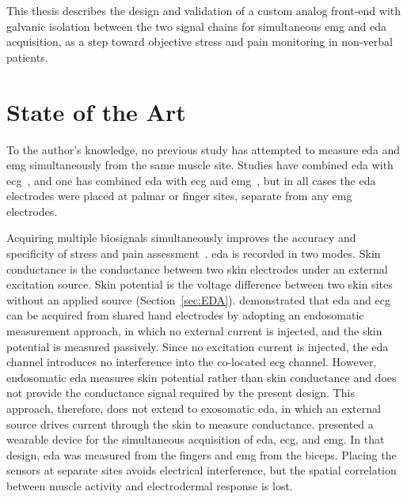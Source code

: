 This thesis describes the design and validation of a custom analog front-end with galvanic isolation between the two signal chains for simultaneous \gls{emg} and \gls{eda} acquisition, as a step toward objective stress and pain monitoring in non-verbal patients.


\section{State of the Art}
To the author's knowledge, no previous study has attempted to measure \gls{eda} and \gls{emg} simultaneously from the same muscle site. Studies have combined \gls{eda} with \gls{ecg}~\cite{affanni_dual_2019, affanni_wireless_2020}, and one has combined \gls{eda} with \gls{ecg} and \gls{emg}~\cite{mcnaboe_design_2022}, but in all cases the \gls{eda} electrodes were placed at palmar or finger sites, separate from any \gls{emg} electrodes.

Acquiring multiple biosignals simultaneously improves the accuracy and specificity of stress and pain assessment~\cite{mcnaboe_design_2022}. \gls{eda} is recorded in two modes. Skin conductance is the conductance between two skin electrodes under an external excitation source. Skin potential is the voltage difference between two skin sites without an applied source (Section~\ref{sec:EDA}). \textcite{affanni_dual_2019} demonstrated that \gls{eda} and \gls{ecg} can be acquired from shared hand electrodes by adopting an endosomatic measurement approach, in which no external current is injected, and the skin potential is measured passively. Since no excitation current is injected, the \gls{eda} channel introduces no interference into the co-located \gls{ecg} channel. However, endosomatic \gls{eda} measures skin potential rather than skin conductance and does not provide the conductance signal required by the present design. This approach, therefore, does not extend to exosomatic \gls{eda}, in which an external source drives current through the skin to measure conductance. \textcite{mcnaboe_design_2022} presented a wearable device for the simultaneous acquisition of \gls{eda}, \gls{ecg}, and \gls{emg}. In that design, \gls{eda} was measured from the fingers and \gls{emg} from the biceps. Placing the sensors at separate sites avoids electrical interference, but the spatial correlation between muscle activity and electrodermal response is lost.

